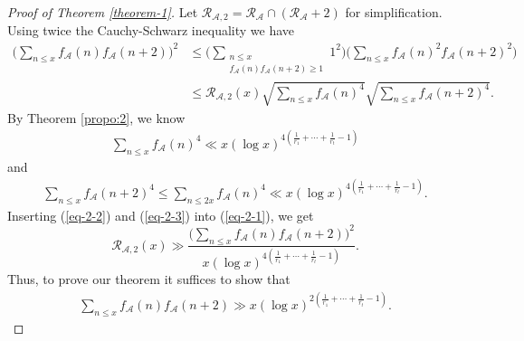 \documentclass[10pt,a4paper]{amsart}
\begin{document}
\begin{proof}[Proof of Theorem \ref{theorem-1}]
Let $\mathcal{R}_{\mathcal{A},2}=\mathcal{R}_{\mathcal{A}}\cap(\mathcal{R}_{\mathcal{A}}+2)$ for simplification. Using twice the Cauchy-Schwarz inequality we have
\begin{align}\label{eq-2-1}
\Big(\sum_{n\le x} f_{\mathcal{A}}(n)f_{\mathcal{A}}(n+2)\Big)^2&\le \Big(\sum_{\substack{n\le x\\ f_{\mathcal{A}}(n)f_{\mathcal{A}}(n+2)\ge 1}} 1^2 \Big)\Big(\sum_{n\le x} f_{\mathcal{A}}(n)^2f_{\mathcal{A}}(n+2)^2\Big)\nonumber\\
&\le \mathcal{R}_{\mathcal{A},2}(x)\sqrt{\sum_{n\le x} f_{\mathcal{A}}(n)^4}\sqrt{\sum_{n\le x} f_{\mathcal{A}}(n+2)^4}.
\end{align}
By Theorem \ref{propo:2}, we know
\begin{align}\label{eq-2-2}
\sum_{n\le x} f_{\mathcal{A}}(n)^4\ll x (\log x)^{4\left(\frac{1}{r_1}+\cdots+\frac{1}{r_t}-1\right)}
\end{align}
and
\begin{align}\label{eq-2-3}
\sum_{n\le x} f_{\mathcal{A}}(n+2)^4\le \sum_{n\le 2x} f_{\mathcal{A}}(n)^4 \ll x (\log x)^{4\left(\frac{1}{r_1}+\cdots+\frac{1}{r_t}-1\right)}.
\end{align}
Inserting  (\ref{eq-2-2}) and (\ref{eq-2-3}) into (\ref{eq-2-1}), we get
$$
\mathcal{R}_{\mathcal{A},2}(x)\gg \frac{\Big(\sum_{n\le x} f_{\mathcal{A}}(n)f_{\mathcal{A}}(n+2)\Big)^2}{x(\log x)^{4\left(\frac{1}{r_1}+\cdots+\frac{1}{r_t}-1\right)}}.
$$
Thus, to prove our theorem it suffices to show that
\begin{align}\label{eq-2-4}
\sum_{n\le x} f_{\mathcal{A}}(n)f_{\mathcal{A}}(n+2)\gg x(\log x)^{2\left(\frac{1}{r_1}+\cdots+\frac{1}{r_t}-1\right)}.
\end{align}


\end{proof}
\end{document}
